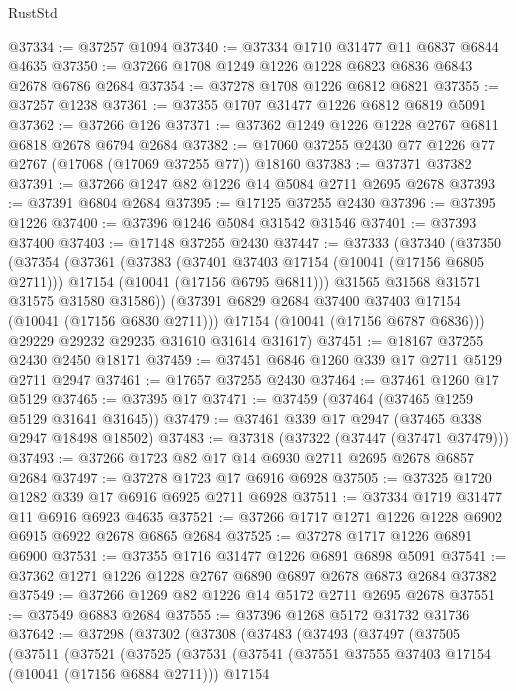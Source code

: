 \begin{lexlean}{RustStd}
\begin{coremodule}
@37334 := @37257 @1094
@37340 := @37334 @1710 @31477 @11 @6837 @6844 @4635
@37350 := @37266 @1708 @1249 @1226 @1228 @6823 @6836 @6843 @2678 @6786 @2684
@37354 := @37278 @1708 @1226 @6812 @6821
@37355 := @37257 @1238
@37361 := @37355 @1707 @31477 @1226 @6812 @6819 @5091
@37362 := @37266 @126
@37371 := @37362 @1249 @1226 @1228 @2767 @6811 @6818 @2678 @6794 @2684
@37382 := @17060 @37255 @2430 @77 @1226 @77 @2767 (@17068 (@17069 @37255 @77)) @18160
@37383 := @37371 @37382
@37391 := @37266 @1247 @82 @1226 @14 @5084 @2711 @2695 @2678
@37393 := @37391 @6804 @2684
@37395 := @17125 @37255 @2430
@37396 := @37395 @1226
@37400 := @37396 @1246 @5084 @31542 @31546
@37401 := @37393 @37400
@37403 := @17148 @37255 @2430
@37447 := @37333
    (@37340
      (@37350
        (@37354
          (@37361
            (@37383
              (@37401 @37403 @17154 (@10041 (@17156 @6805 @2711)))
              @17154
              (@10041 (@17156 @6795 @6811)))
            @31565
            @31568
            @31571
            @31575
            @31580
            @31586))
        (@37391 @6829 @2684 @37400 @37403 @17154 (@10041 (@17156 @6830 @2711)))
        @17154
        (@10041 (@17156 @6787 @6836)))
      @29229
      @29232
      @29235
      @31610
      @31614
      @31617)
@37451 := @18167 @37255 @2430 @2450 @18171
@37459 := @37451 @6846 @1260 @339 @17 @2711 @5129 @2711 @2947
@37461 := @17657 @37255 @2430
@37464 := @37461 @1260 @17 @5129
@37465 := @37395 @17
@37471 := @37459 (@37464 (@37465 @1259 @5129 @31641 @31645))
@37479 := @37461 @339 @17 @2947 (@37465 @338 @2947 @18498 @18502)
@37483 := @37318 (@37322 (@37447 (@37471 @37479)))
@37493 := @37266 @1723 @82 @17 @14 @6930 @2711 @2695 @2678 @6857 @2684
@37497 := @37278 @1723 @17 @6916 @6928
@37505 := @37325 @1720 @1282 @339 @17 @6916 @6925 @2711 @6928
@37511 := @37334 @1719 @31477 @11 @6916 @6923 @4635
@37521 := @37266 @1717 @1271 @1226 @1228 @6902 @6915 @6922 @2678 @6865 @2684
@37525 := @37278 @1717 @1226 @6891 @6900
@37531 := @37355 @1716 @31477 @1226 @6891 @6898 @5091
@37541 := @37362 @1271 @1226 @1228 @2767 @6890 @6897 @2678 @6873 @2684 @37382
@37549 := @37266 @1269 @82 @1226 @14 @5172 @2711 @2695 @2678
@37551 := @37549 @6883 @2684
@37555 := @37396 @1268 @5172 @31732 @31736
@37642 := @37298
    (@37302
      (@37308
        (@37483
          (@37493
            (@37497
              (@37505
                (@37511
                  (@37521
                    (@37525
                      (@37531
                        (@37541
                          (@37551 @37555 @37403 @17154 (@10041 (@17156 @6884 @2711)))
                          @17154

\end{coremodule}
\end{lexlean}
